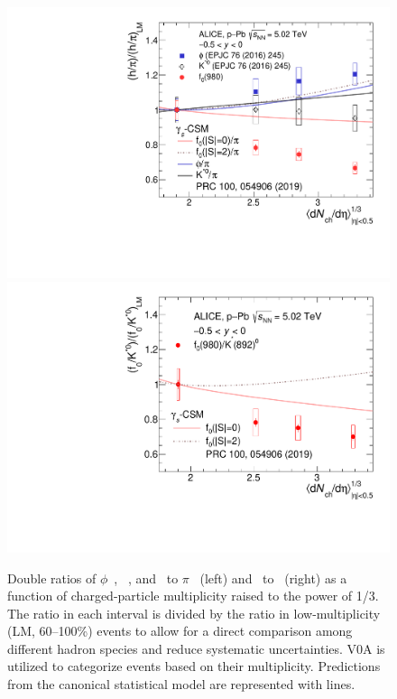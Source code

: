 \begin{figure}[!hbt]
	\centering
	\includegraphics[width=0.49 \textwidth]{figures/Fig4_DR_pion.pdf} 
        \includegraphics[width=0.49 \textwidth]{figures/Fig5_DR_Kstar.pdf} 
	\caption{ Double ratios of $\phi$~\cite{ALICE:2016sak}, \kstar~\cite{ALICE:2016sak}, and \fzero~to $\pi$~\cite{ALICE:2016dei} (left) and \fzero~to \kstar~(right) as a function of charged-particle multiplicity raised to the power of 1/3. The ratio in each interval is divided by the ratio in low-multiplicity (LM, 60--100\%) events to allow for a direct comparison among different hadron species and reduce systematic uncertainties. V0A is utilized to categorize events based on their multiplicity. Predictions from the canonical statistical model are represented with lines. }
	\label{fig:f0piAddCSM}
\end{figure}


